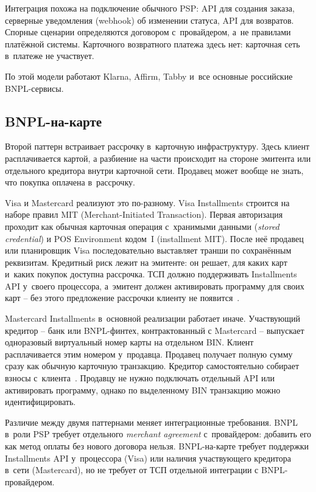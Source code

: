 Интеграция похожа на подключение обычного PSP: API
для создания заказа, серверные уведомления (webhook) об изменении
статуса, API для возвратов. Спорные сценарии определяются договором
с~провайдером, а~не правилами платёжной системы. Карточного
возвратного платежа здесь нет: карточная сеть в~платеже не участвует.

По этой модели работают Klarna, Affirm, Tabby и~все основные
российские BNPL-сервисы.

\subsection*{BNPL-на-карте}

Второй паттерн встраивает рассрочку в~карточную инфраструктуру. Здесь
клиент расплачивается картой, а разбиение на части происходит
на стороне эмитента или отдельного кредитора внутри карточной сети.
Продавец может вообще не знать, что покупка оплачена в~рассрочку.

Visa и Mastercard реализуют это по-разному. Visa Installments
строится на наборе правил MIT (Merchant-Initiated Transaction).
Первая авторизация проходит как обычная карточная операция
с~хранимыми данными (\textit{stored credential}) и POS Environment
кодом~I (installment MIT). После неё продавец или
планировщик Visa последовательно выставляет транши по сохранённым
реквизитам. Кредитный риск лежит на эмитенте: он решает,
для каких карт и~каких покупок доступна рассрочка. ТСП должно
поддерживать Installments API у~своего процессора, а~эмитент должен
активировать программу для своих карт -- без этого предложение
рассрочки клиенту не появится~\cite{visa-installments}.

Mastercard Installments в~основной реализации работает иначе.
Участвующий кредитор -- банк или BNPL-финтех, контрактованный
с Mastercard -- выпускает одноразовый виртуальный номер карты на
отдельном BIN. Клиент расплачивается этим номером у~продавца.
Продавец получает полную сумму сразу как обычную карточную
транзакцию. Кредитор самостоятельно собирает взносы
с~клиента~\cite{mc-installments}. Продавцу не нужно
подключать отдельный API или активировать программу, однако
по выделенному BIN транзакцию можно идентифицировать.

Различие между двумя паттернами меняет интеграционные требования.
BNPL в~роли PSP требует отдельного \textit{merchant agreement} с~провайдером:
добавить его как метод оплаты без нового договора нельзя.
BNPL-на-карте требует поддержки Installments API у~процессора
(Visa) или наличия участвующего кредитора в~сети (Mastercard),
но не требует от ТСП отдельной интеграции с BNPL-провайдером.


